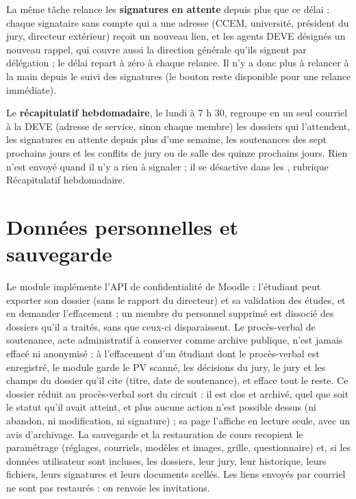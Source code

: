 \documentclass[11pt,a4paper]{article}
\begin{document}
La même tâche relance les \textbf{signatures en attente} depuis plus que ce
délai : chaque signataire sans compte qui a une adresse (CCEM, université,
président du jury, directeur extérieur) reçoit un nouveau lien, et les agents
DEVE désignés un nouveau rappel, qui couvre aussi la direction générale qu'ils
signent par délégation ; le délai repart à zéro à
chaque relance. Il n'y a donc plus à relancer à la main depuis le suivi des
signatures (le bouton reste disponible pour une relance immédiate).

Le \textbf{récapitulatif hebdomadaire}, le lundi à 7 h 30, regroupe en un seul
courriel à la DEVE (adresse de service, sinon chaque membre) les dossiers qui
l'attendent, les signatures en attente depuis plus d'une semaine, les
soutenances des sept prochains jours et les conflits de jury ou de salle des
quinze prochains jours. Rien n'est envoyé quand il n'y a rien à signaler ; il se
désactive dans les , rubrique
\og Récapitulatif hebdomadaire\fg{}.

\section{Données personnelles et sauvegarde}

Le module implémente l'API de confidentialité de Moodle : l'étudiant peut
exporter son dossier (sans le rapport du directeur) et sa validation des études,
et en demander l'effacement ; un membre du personnel supprimé est dissocié des dossiers qu'il a
traités, sans que ceux-ci disparaissent. Le procès-verbal de soutenance, acte
administratif à conserver comme archive publique, n'est jamais effacé ni
anonymisé : à l'effacement d'un étudiant dont le procès-verbal est enregistré,
le module garde le PV scanné, les décisions du jury, le jury et les champs du
dossier qu'il cite (titre, date de soutenance), et efface tout le reste. Ce dossier
réduit au procès-verbal sort du circuit : il est clos et archivé, quel que soit
le statut qu'il avait atteint, et plus aucune action n'est possible dessus (ni
abandon, ni modification, ni signature) ; sa page l'affiche en lecture seule,
avec un avis d'archivage. La sauvegarde et la restauration de
cours recopient le paramétrage (réglages, courriels, modèles et images, grille,
questionnaire) et, si les données utilisateur sont incluses, les dossiers, leur
jury, leur historique, leurs fichiers, leurs signatures et leurs documents
scellés. Les liens envoyés par courriel ne sont pas restaurés : on renvoie les
invitations.
\end{document}
